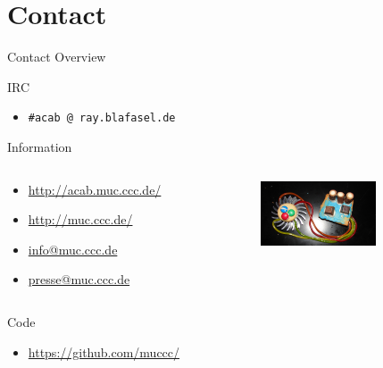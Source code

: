 \documentclass{beamer}
\begin{document}
\section{Contact}
\begin{frame}{Contact Overview}
  \begin{block}{IRC}
    \begin{itemize}
	\item {\tt \#acab @ ray.blafasel.de}
    \end{itemize}
  \end{block}
  \begin{block}{Information}
    \begin{columns}
      \begin{column}{6.5cm}
        \begin{itemize}
        \item \url{http://acab.muc.ccc.de/}
        \item \url{http://muc.ccc.de/}
	\item \url{info@muc.ccc.de}
	\item \url{presse@muc.ccc.de}
        \end{itemize}
      \end{column}
      \begin{column}{4cm}
        \includegraphics[width=3.4cm, clip, trim 2cm 0 2cm 0]{bilder/kekslampe.JPG}
      \end{column}
    \end{columns}
  \end{block}
  \begin{block}{Code}
    \begin{itemize}
      \item \url{https://github.com/muccc/}
    \end{itemize}
  \end{block}
\end{frame}
\end{document}
